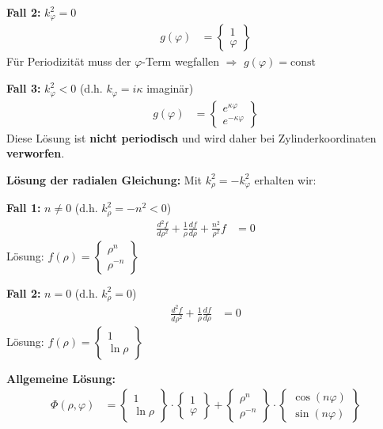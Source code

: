 \textbf{Fall 2:} $k_\varphi^2 = 0$
\begin{align}
g(\varphi) &= \begin{Bmatrix} 1 \\ \varphi \end{Bmatrix}
\end{align}
Für Periodizität muss der $\varphi$-Term wegfallen $\Rightarrow$ $g(\varphi) = \text{const}$

\textbf{Fall 3:} $k_\varphi^2 < 0$ (d.h. $k_\varphi = i\kappa$ imaginär)
\begin{align}
g(\varphi) &= \begin{Bmatrix} e^{\kappa\varphi} \\ e^{-\kappa\varphi} \end{Bmatrix}
\end{align}
Diese Lösung ist \textbf{nicht periodisch} und wird daher bei Zylinderkoordinaten \textbf{verworfen}.

\textbf{Lösung der radialen Gleichung:}
Mit $k_\rho^2 = -k_\varphi^2$ erhalten wir:

\textbf{Fall 1:} $n \neq 0$ (d.h. $k_\rho^2 = -n^2 < 0$)
\begin{align}
\frac{d^2 f}{d\rho^2} + \frac{1}{\rho}\frac{df}{d\rho} + \frac{n^2}{\rho^2}f &= 0
\end{align}
Lösung: $f(\rho) = \begin{Bmatrix} \rho^n \\ \rho^{-n} \end{Bmatrix}$

\textbf{Fall 2:} $n = 0$ (d.h. $k_\rho^2 = 0$)
\begin{align}
\frac{d^2 f}{d\rho^2} + \frac{1}{\rho}\frac{df}{d\rho} &= 0
\end{align}
Lösung: $f(\rho) = \begin{Bmatrix} 1 \\ \ln\rho \end{Bmatrix}$

\textbf{Allgemeine Lösung:}
\begin{align}
\Phi(\rho,\varphi) &= \begin{Bmatrix} 1 \\ \ln\rho \end{Bmatrix} \cdot \begin{Bmatrix} 1 \\ \varphi \end{Bmatrix} + \begin{Bmatrix} \rho^n \\ \rho^{-n} \end{Bmatrix} \cdot \begin{Bmatrix} \cos(n\varphi) \\ \sin(n\varphi) \end{Bmatrix}
\end{align}



